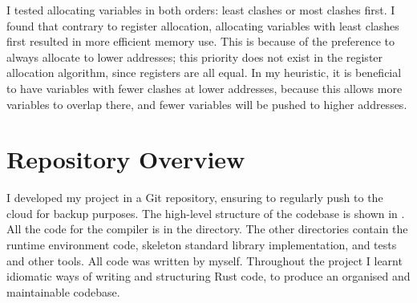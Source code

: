 \documentclass[00-main.tex]{subfiles}
\begin{document}
I tested allocating variables in both orders: least clashes or most clashes first.
I found that contrary to register allocation, allocating variables with least clashes first resulted in more efficient memory use.
This is because of the preference to always allocate to lower addresses; this priority does not exist in the register allocation algorithm, since registers are all equal.
In my heuristic, it is beneficial to have variables with fewer clashes at lower addresses, because this allows more variables to overlap there, and fewer variables will be pushed to higher addresses.



\FloatBarrier %

\vspace{-2ex} %
\section{Repository Overview}
\vspace{-1ex}

I developed my project in a Git repository, ensuring to regularly push to the cloud for backup purposes.
The high-level structure of the codebase is shown in .
All the code for the compiler is in the  directory.
The other directories contain the runtime environment code, skeleton standard library implementation, and tests and other tools.
All code was written by myself.
Throughout the project I learnt idiomatic ways of writing and structuring Rust code, to produce an organised and maintainable codebase.

\newlength\IndentWidth\setlength\IndentWidth{1em}
\end{document}
